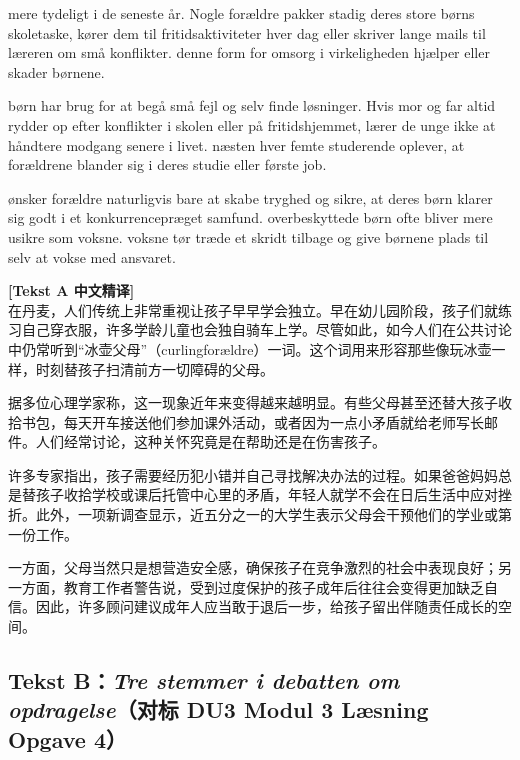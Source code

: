   mere tydeligt i de seneste år. Nogle forældre pakker stadig deres store børns skoletaske, kører dem til fritidsaktiviteter hver dag eller skriver lange mails til læreren om små konflikter.  denne form for omsorg i virkeligheden hjælper eller skader børnene.

 børn har brug for at begå små fejl og selv finde løsninger. Hvis mor og far altid rydder op efter konflikter i skolen eller på fritidshjemmet, lærer de unge ikke at håndtere modgang senere i livet.  næsten hver femte studerende oplever, at forældrene blander sig i deres studie eller første job.

 ønsker forældre naturligvis bare at skabe tryghed og sikre, at deres børn klarer sig godt i et konkurrencepræget samfund.   overbeskyttede børn ofte bliver mere usikre som voksne.  voksne tør træde et skridt tilbage og give børnene plads til selv at vokse med ansvaret.

\begin{transbox}
\small
\textbf{\color{NCDTeal}[Tekst A 中文精译]}\\
在丹麦，人们传统上非常重视让孩子早早学会独立。早在幼儿园阶段，孩子们就练习自己穿衣服，许多学龄儿童也会独自骑车上学。尽管如此，如今人们在公共讨论中仍常听到“冰壶父母”（curlingforældre）一词。这个词用来形容那些像玩冰壶一样，时刻替孩子扫清前方一切障碍的父母。

据多位心理学家称，这一现象近年来变得越来越明显。有些父母甚至还替大孩子收拾书包，每天开车接送他们参加课外活动，或者因为一点小矛盾就给老师写长邮件。人们经常讨论，这种关怀究竟是在帮助还是在伤害孩子。

许多专家指出，孩子需要经历犯小错并自己寻找解决办法的过程。如果爸爸妈妈总是替孩子收拾学校或课后托管中心里的矛盾，年轻人就学不会在日后生活中应对挫折。此外，一项新调查显示，近五分之一的大学生表示父母会干预他们的学业或第一份工作。

一方面，父母当然只是想营造安全感，确保孩子在竞争激烈的社会中表现良好；另一方面，教育工作者警告说，受到过度保护的孩子成年后往往会变得更加缺乏自信。因此，许多顾问建议成年人应当敢于退后一步，给孩子留出伴随责任成长的空间。
\end{transbox}

\subsection*{Tekst B：\textit{Tre stemmer i debatten om opdragelse}（对标 DU3 Modul 3 Læsning Opgave 4）}

